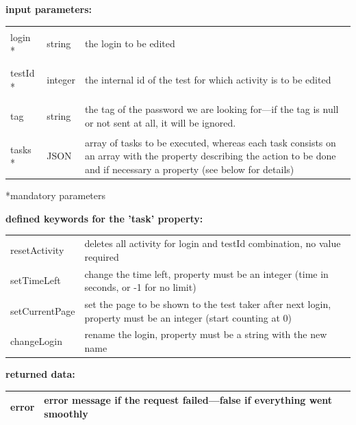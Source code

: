 \documentclass[12pt]{article} %
\newenvironment{keyword}{\leavevmode\color{magenta}}{}
\newenvironment{properties}
{
    \footnotesize\renewcommand{\arraystretch}{1.30}
    \renewcommand{\tabcolsep}{0pt}
    \begin{longtable}{>{\begin{keyword}}p{3.1cm}<{\end{keyword}}p{13.9cm}}
        \hline
        }
        {
        \hline
    \end{longtable}\vspace{5mm}
}
\newenvironment{parameters}
{
    \footnotesize\renewcommand{\arraystretch}{1.30}
    \renewcommand{\tabcolsep}{0pt}
    \begin{longtable}{>{\begin{keyword}}p{3cm}<{\end{keyword}}>{\begin{em}}p{1.5cm}<{\end{em}}p{12.5cm}}
        \hline
        }
        {
        \hline
    \end{longtable}\scriptsize\vspace{-5mm}*mandatory parameters\vspace{5mm}
}
\begin{document}
    \begin{minipage}{\textwidth}
        \textbf{input parameters:}
        \begin{parameters}
            login *  & string  & the login to be edited                                                                                                                                                                 \\
            testId * & integer & the internal id of the test for which activity is to be edited                                                                                                                         \\
            tag      & string  & the tag of the password we are looking for—if the tag is null or not sent at all, it will be ignored.                                                                                  \\
            tasks *  & JSON    & array of tasks to be executed, whereas each task consists on an array with the property \kw{task} describing the action to be done and if necessary a property \kw{value} (see below for details) \\
        \end{parameters}
    \end{minipage}

    \begin{minipage}{\textwidth}
        \textbf{defined keywords for the 'task' property:}
        \begin{properties}
            resetActivity  & deletes all activity for login and testId combination, no value required                                             \\
            setTimeLeft    & change the time left, \kw{value} property must be an integer (time in seconds, or -1 for no limit)                        \\
            setCurrentPage & set the page to be shown to the test taker after next login, \kw{value} property must be an integer (start counting at 0) \\
            changeLogin    & rename the login, \kw{value} property must be a string with the new name                                                  \\
        \end{properties}
    \end{minipage}

    \begin{minipage}{\textwidth}
        \textbf{returned data:}
        \begin{properties}
            error & error message if the request failed—false if everything went smoothly\\
        \end{properties}
    \end{minipage}
\end{document}

